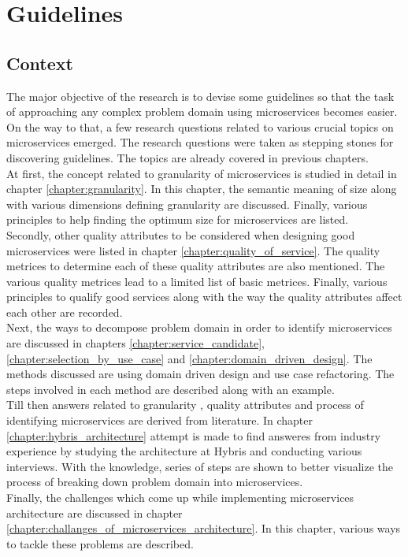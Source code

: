 \chapter{Guidelines}\label{chapter:guidelines}
\section{Context}\label{section:guidelines/context}
The major objective of the research is to devise some guidelines so that the task of approaching any complex problem domain using microservices becomes easier. On the way to that, a few research questions related to various crucial topics on microservices emerged. The research questions were taken as stepping stones for discovering guidelines. The topics are already covered in previous chapters. 
\\
At first, the concept related to granularity of microservices is studied in detail in chapter \ref{chapter:granularity}. In this chapter, the semantic meaning of size along with various dimensions defining granularity are discussed. Finally, various principles to help finding the optimum size for microservices are listed.
\\
Secondly, other quality attributes to be considered when designing good microservices were listed in chapter \ref{chapter:quality_of_service}. The quality metrices to determine each of these quality attributes are also mentioned. The various quality metrices lead to a limited list of basic metrices. Finally, various principles to qualify good services along with the way the quality attributes affect each other are recorded.
\\
Next, the ways to decompose problem domain in order to identify microservices are discussed in chapters \ref{chapter:service_candidate}, \ref{chapter:selection_by_use_case} and \ref{chapter:domain_driven_design}. The methods discussed are using domain driven design and use case refactoring. The steps involved in each method are described along with an example.
\\
Till then answers related to granularity , quality attributes and process of identifying microservices are derived from literature. In chapter \ref{chapter:hybris_architecture} attempt is made to find answeres from industry experience by studying the architecture at Hybris and conducting various interviews. With the knowledge, series of steps are shown to better visualize the process of breaking down problem domain into microservices.
\\
Finally, the challenges which come up while implementing microservices architecture are discussed in chapter \ref{chapter:challanges_of_microservices_architecture}. In this chapter, various ways to tackle these problems are described.

